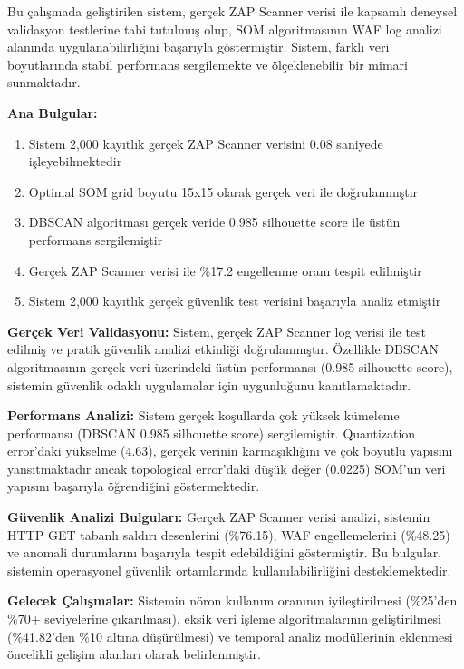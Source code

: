 Bu çalışmada geliştirilen sistem, gerçek ZAP Scanner verisi ile kapsamlı deneysel validasyon testlerine tabi tutulmuş olup, SOM algoritmasının WAF log analizi alanında uygulanabilirliğini başarıyla göstermiştir. Sistem, farklı veri boyutlarında stabil performans sergilemekte ve ölçeklenebilir bir mimari sunmaktadır.

\textbf{Ana Bulgular:}
\begin{enumerate}
    \item Sistem 2,000 kayıtlık gerçek ZAP Scanner verisini 0.08 saniyede işleyebilmektedir
    \item Optimal SOM grid boyutu 15x15 olarak gerçek veri ile doğrulanmıştır
    \item DBSCAN algoritması gerçek veride 0.985 silhouette score ile üstün performans sergilemiştir
    \item Gerçek ZAP Scanner verisi ile \%17.2 engellenme oranı tespit edilmiştir
    \item Sistem 2,000 kayıtlık gerçek güvenlik test verisini başarıyla analiz etmiştir
\end{enumerate}

\textbf{Gerçek Veri Validasyonu:} Sistem, gerçek ZAP Scanner log verisi ile test edilmiş ve pratik güvenlik analizi etkinliği doğrulanmıştır. Özellikle DBSCAN algoritmasının gerçek veri üzerindeki üstün performansı (0.985 silhouette score), sistemin güvenlik odaklı uygulamalar için uygunluğunu kanıtlamaktadır.

\textbf{Performans Analizi:} Sistem gerçek koşullarda çok yüksek kümeleme performansı (DBSCAN 0.985 silhouette score) sergilemiştir. Quantization error'daki yükselme (4.63), gerçek verinin karmaşıklığını ve çok boyutlu yapısını yansıtmaktadır ancak topological error'daki düşük değer (0.0225) SOM'un veri yapısını başarıyla öğrendiğini göstermektedir.

\textbf{Güvenlik Analizi Bulguları:} Gerçek ZAP Scanner verisi analizi, sistemin HTTP GET tabanlı saldırı desenlerini (\%76.15), WAF engellemelerini (\%48.25) ve anomali durumlarını başarıyla tespit edebildiğini göstermiştir. Bu bulgular, sistemin operasyonel güvenlik ortamlarında kullanılabilirliğini desteklemektedir.

\textbf{Gelecek Çalışmalar:} Sistemin nöron kullanım oranının iyileştirilmesi (\%25'den \%70+ seviyelerine çıkarılması), eksik veri işleme algoritmalarının geliştirilmesi (\%41.82'den \%10 altına düşürülmesi) ve temporal analiz modüllerinin eklenmesi öncelikli gelişim alanları olarak belirlenmiştir. 
